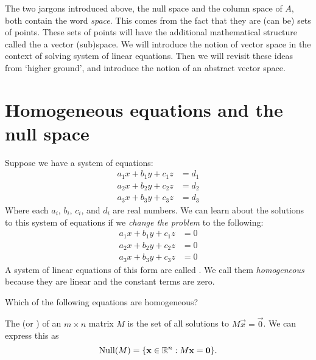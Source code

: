 \documentclass{ximera}
\begin{document}
The two jargons introduced above, the null space and the column space of $A$,
both contain the word \textit{space}. This comes from the fact that they are (can be)
sets of points. These sets of points will have the additional mathematical
structure called the a vector (sub)space. We will introduce the notion of vector
space in the context of solving system of linear equations. Then we will revisit
these ideas from `higher ground', and introduce the notion of an abstract vector
space.

\section{Homogeneous equations and the null space}
Suppose we have a system of equations:
\begin{align*}
  a_1 x + b_1 y + c_1 z &= d_1\\
  a_2 x + b_2 y + c_2 z &= d_2\\
  a_3 x + b_3 y + c_3 z &= d_3
\end{align*}
Where each $a_i$, $b_i$, $c_i$, and $d_i$ are real numbers. We can
learn about the solutions to this system of equations if we
\textit{change the problem} to the following:
\begin{align*}
  a_1 x + b_1 y + c_1 z &= 0  \\
  a_2 x + b_2 y + c_2 z &= 0  \\
  a_3 x + b_3 y + c_3 z &= 0
\end{align*}
A system of linear equations of this form are called . We call
them \textit{homogeneous} because they are linear and the constant terms are zero.


\begin{question}
  Which of the following equations are homogeneous?
  \begin{selectAll}
  \end{selectAll}
\end{question}



\begin{definition}
  The  (or ) of an $m \times n$ matrix $M$ is
  the set of all solutions to $M\vec{x} = \vec{0}$. We can express
  this as
  \[
  \operatorname{Null}(M) = \{ \mathbf{x}\in\mathbb{R}^n: M\mathbf{x} = \mathbf{0}\}.
  \]
\end{definition}
\end{document}
